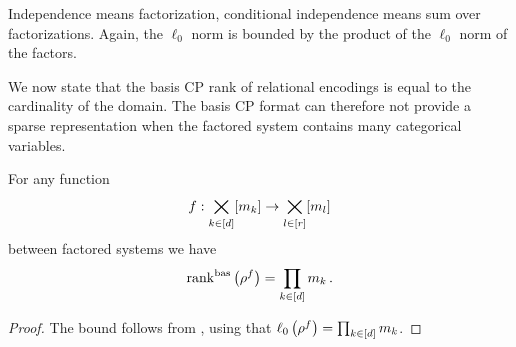 \begin{example}
    Independence means factorization, conditional independence means sum over factorizations.
    Again, the $\ell_0$ norm is bounded by the product of the $\ell_0$ norm of the factors.
\end{example}






We now state that the basis CP rank of relational encodings is equal to the cardinality of the domain.
The basis CP format can therefore not provide a sparse representation when the factored system contains many categorical variables.


\begin{theorem}
    \label{the:rencodingBasCP}
    For any function
    \[ f : \bigtimes_{k\in[d]}[m_{k}] \rightarrow  \bigtimes_{l\in[r]}[m_{l}] \]
    between factored systems we have
    \[ \mathrm{rank}^{\mathrm{bas}}\left(\rho^{f}\right) =  \prod_{k\in[d]}m_{k} \, . \]
\end{theorem}
\begin{proof}
    The bound follows from , using that $\ell_0\left(\rho^{f}\right)=\prod_{k\in[d]}m_{k}$.
\end{proof}

